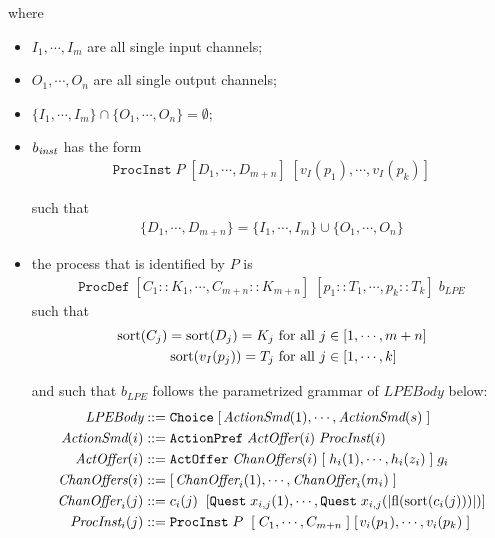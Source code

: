 where

\begin{itemize}
\item $I_1, \cdots{}, I_m$ are all single input channels;
\item $O_1, \cdots{}, O_n$ are all single output channels;
\item $\{ I_1, \cdots{}, I_m \} \cap \{ O_1, \cdots{}, O_n \} = \emptyset{}$;
\item $b_\text{\textit{inst}}$ has the form
\begin{align*}
\texttt{ProcInst} \; P \; [D_1, \cdots{}, D_{m+n}] \; [v_I(p_1), \cdots{}, v_I(p_k)]
\end{align*}

such that
\begin{align*}
\{ D_1, \cdots{}, D_{m+n} \} = \{ I_1, \cdots{}, I_m \} \cup \{ O_1, \cdots{}, O_n \}
\end{align*}

\item the \txs{} process that is identified by $P$ is
\begin{align*}
\texttt{ProcDef} \; [C_1 :: K_1, \cdots{}, C_{m+n} :: K_{m+n}] \; [p_1 :: T_1, \cdots{}, p_k :: T_k] \; b_\textit{LPE}
\end{align*}
such that
\begin{align*}
\text{sort}(C_j) = \text{sort}(D_j) = K_j &\text{ for all } j \in [1, \cdots{}, m+n] \\
\text{sort}(v_I(p_j)) = T_j &\text{ for all } j \in [1, \cdots{}, k]
\end{align*}

and such that $b_\textit{LPE}$ follows the parametrized grammar of $\textit{LPEBody}$ below:
\begin{align*}
\textit{LPEBody} &::= \texttt{Choice} \; [ \;\! \textit{ActionSmd}(1), \cdots{}, \textit{ActionSmd}(s) \; ] \\
\textit{ActionSmd}(i) &::= \texttt{ActionPref} \; \textit{ActOffer}(i) \; \textit{ProcInst}(i) \\
\textit{ActOffer}(i) &::= \texttt{ActOffer} \; \textit{ChanOffers}(i) \; [ \; h_i(1), \cdots{}, h_i(z_i) \; ] \; g_i \\
\textit{ChanOffers}(i) &::= [ \;\! \textit{ChanOffer}_i(1), \cdots{}, \textit{ChanOffer}_i(m_i) \; ] \\
\textit{ChanOffer}_i(j) &::= c_i(j) \;\; [\texttt{Quest} \; x_{i,j}(1), \cdots{}, \texttt{Quest} \; x_{i,j}(|\text{fl}(\text{sort}(c_i(j)))|)] \\
\textit{ProcInst}_i(j) &::= \texttt{ProcInst} \; P \; \; [ \; C_1, \cdots{}, C_{m+n} \; ] \; [\;\!v_i(p_1), \cdots{}, v_i(p_k) \; ]
\end{align*}


\end{itemize}
